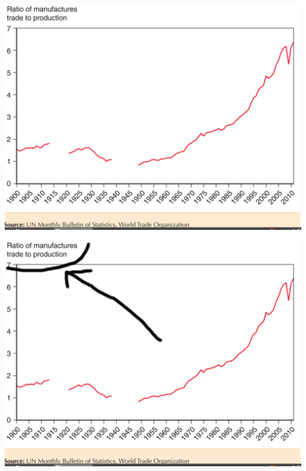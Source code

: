 \documentclass[ignorenonframetext,]{beamer}
\begin{document}
\begin{frame}

    \includegraphics[scale=0.25]{Text_fig_2_5.png}

\end{frame}

\begin{frame}

    \includegraphics[scale=0.25]{Text_fig_2_5_tricky.png}

\end{frame}
\end{document}
